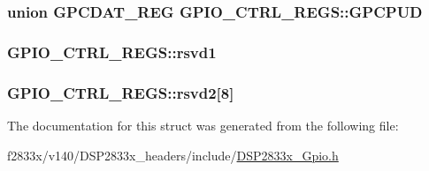 \subsubsection[{G\+P\+C\+P\+U\+D}]{\setlength{\rightskip}{0pt plus 5cm}union {\bf G\+P\+C\+D\+A\+T\+\_\+\+R\+E\+G} G\+P\+I\+O\+\_\+\+C\+T\+R\+L\+\_\+\+R\+E\+G\+S\+::\+G\+P\+C\+P\+U\+D}\label{struct_g_p_i_o___c_t_r_l___r_e_g_s_a30a13b7a36f5076dd87c7957c9d9461f}
\hypertarget{struct_g_p_i_o___c_t_r_l___r_e_g_s_a85066fcf35918e216ba6e16d18372ac8}{}
\subsubsection[{rsvd1}]{ G\+P\+I\+O\+\_\+\+C\+T\+R\+L\+\_\+\+R\+E\+G\+S\+::rsvd1}\label{struct_g_p_i_o___c_t_r_l___r_e_g_s_a85066fcf35918e216ba6e16d18372ac8}
\hypertarget{struct_g_p_i_o___c_t_r_l___r_e_g_s_a80a3eb93df3580588149e86f587dfb45}{}
\subsubsection[{rsvd2}]{ G\+P\+I\+O\+\_\+\+C\+T\+R\+L\+\_\+\+R\+E\+G\+S\+::rsvd2\mbox{[}8\mbox{]}}\label{struct_g_p_i_o___c_t_r_l___r_e_g_s_a80a3eb93df3580588149e86f587dfb45}


The documentation for this struct was generated from the following file\+:\begin{DoxyCompactItemize}
\item 
f2833x/v140/\+D\+S\+P2833x\+\_\+headers/include/\hyperlink{_d_s_p2833x___gpio_8h}{D\+S\+P2833x\+\_\+\+Gpio.\+h}\end{DoxyCompactItemize}
